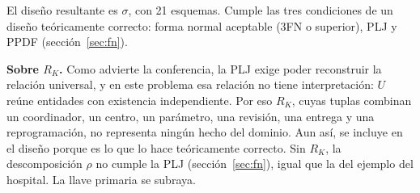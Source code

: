 \documentclass[11pt,a4paper]{article}
\begin{document}
El diseño resultante es $\sigma$, con 21 esquemas. Cumple las tres condiciones de un diseño teóricamente correcto: forma normal aceptable (3FN o superior), PLJ y PPDF (sección~\ref{sec:fn}).

\textbf{Sobre $R_K$.} Como advierte la conferencia, la PLJ exige poder reconstruir la relación universal, y en este problema esa relación no tiene interpretación: $U$ reúne entidades con existencia independiente. Por eso $R_K$, cuyas tuplas combinan un coordinador, un centro, un parámetro, una revisión, una entrega y una reprogramación, no representa ningún hecho del dominio. Aun así, se incluye en el diseño porque es lo que lo hace teóricamente correcto. Sin $R_K$, la descomposición $\rho$ no cumple la PLJ (sección~\ref{sec:fn}), igual que la del ejemplo del hospital. La llave primaria se subraya.
\end{document}
